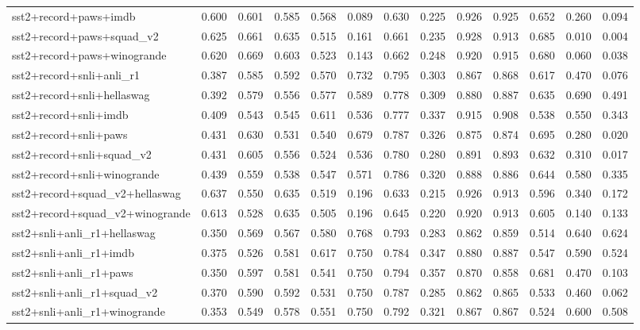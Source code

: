 \begin{table}[t]
\begin{tabular}{lrrrrrrrrrrrr}
    sst2+record+paws+imdb & 0.600 & 0.601 & 0.585 & 0.568 & 0.089 & 0.630 & 0.225 & 0.926 & 0.925 & 0.652 & 0.260 & 0.094 \\
    sst2+record+paws+squad\_v2 & 0.625 & 0.661 & 0.635 & 0.515 & 0.161 & 0.661 & 0.235 & 0.928 & 0.913 & 0.685 & 0.010 & 0.004 \\
    sst2+record+paws+winogrande & 0.620 & 0.669 & 0.603 & 0.523 & 0.143 & 0.662 & 0.248 & 0.920 & 0.915 & 0.680 & 0.060 & 0.038 \\
    sst2+record+snli+anli\_r1 & 0.387 & 0.585 & 0.592 & 0.570 & 0.732 & 0.795 & 0.303 & 0.867 & 0.868 & 0.617 & 0.470 & 0.076 \\
    sst2+record+snli+hellaswag & 0.392 & 0.579 & 0.556 & 0.577 & 0.589 & 0.778 & 0.309 & 0.880 & 0.887 & 0.635 & 0.690 & 0.491 \\
    sst2+record+snli+imdb & 0.409 & 0.543 & 0.545 & 0.611 & 0.536 & 0.777 & 0.337 & 0.915 & 0.908 & 0.538 & 0.550 & 0.343 \\
    sst2+record+snli+paws & 0.431 & 0.630 & 0.531 & 0.540 & 0.679 & 0.787 & 0.326 & 0.875 & 0.874 & 0.695 & 0.280 & 0.020 \\
    sst2+record+snli+squad\_v2 & 0.431 & 0.605 & 0.556 & 0.524 & 0.536 & 0.780 & 0.280 & 0.891 & 0.893 & 0.632 & 0.310 & 0.017 \\
    sst2+record+snli+winogrande & 0.439 & 0.559 & 0.538 & 0.547 & 0.571 & 0.786 & 0.320 & 0.888 & 0.886 & 0.644 & 0.580 & 0.335 \\
    sst2+record+squad\_v2+hellaswag & 0.637 & 0.550 & 0.635 & 0.519 & 0.196 & 0.633 & 0.215 & 0.926 & 0.913 & 0.596 & 0.340 & 0.172 \\
    sst2+record+squad\_v2+winogrande & 0.613 & 0.528 & 0.635 & 0.505 & 0.196 & 0.645 & 0.220 & 0.920 & 0.913 & 0.605 & 0.140 & 0.133 \\
    sst2+snli+anli\_r1+hellaswag & 0.350 & 0.569 & 0.567 & 0.580 & 0.768 & 0.793 & 0.283 & 0.862 & 0.859 & 0.514 & 0.640 & 0.624 \\
    sst2+snli+anli\_r1+imdb & 0.375 & 0.526 & 0.581 & 0.617 & 0.750 & 0.784 & 0.347 & 0.880 & 0.887 & 0.547 & 0.590 & 0.524 \\
    sst2+snli+anli\_r1+paws & 0.350 & 0.597 & 0.581 & 0.541 & 0.750 & 0.794 & 0.357 & 0.870 & 0.858 & 0.681 & 0.470 & 0.103 \\
    sst2+snli+anli\_r1+squad\_v2 & 0.370 & 0.590 & 0.592 & 0.531 & 0.750 & 0.787 & 0.285 & 0.862 & 0.865 & 0.533 & 0.460 & 0.062 \\
    sst2+snli+anli\_r1+winogrande & 0.353 & 0.549 & 0.578 & 0.551 & 0.750 & 0.792 & 0.321 & 0.867 & 0.867 & 0.524 & 0.600 & 0.508 \\

\end{tabular}
\end{table}
